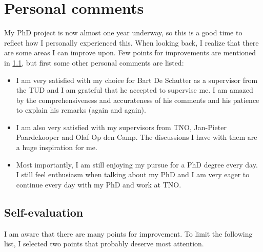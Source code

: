 \section{Personal comments}
\label{sec:personal}

My PhD project is now almost one year underway, so this is a good time to reflect how I personally experienced this. When looking back, I realize that there are some areas I can improve upon. Few points for improvements are mentioned in \cref{sec:evaluation}, but first some other personal comments are listed:
\begin{itemize}
	\item I am very satisfied with my choice for Bart De Schutter as a supervisor from the TUD and I am grateful that he accepted to supervise me. I am amazed by the comprehensiveness and accurateness of his comments and his patience to explain his remarks (again and again).
	\item I am also very satisfied with my supervisors from TNO, Jan-Pieter Paardekooper and Olaf Op den Camp. The discussions I have with them are a huge inspiration for me.
	\item Most importantly, I am still enjoying my pursue for a PhD degree every day. I still feel enthusiasm when talking about my PhD and I am very eager to continue every day with my PhD and work at TNO. 
\end{itemize}

\subsection{Self-evaluation}
\label{sec:evaluation}

I am aware that there are many points for improvement. To limit the following list, I selected two points that probably deserve most attention.

